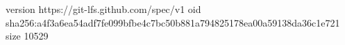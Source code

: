version https://git-lfs.github.com/spec/v1
oid sha256:a4f3a6ea54adf7fe099bfbe4c7bc50b881a794825178ea00a59138da36c1e721
size 10529
